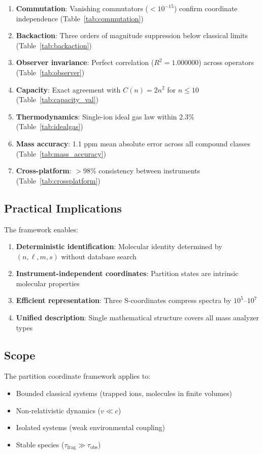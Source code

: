 \begin{enumerate}
    \item \textbf{Commutation}: Vanishing commutators ($< 10^{-15}$) confirm coordinate independence (Table~\ref{tab:commutation})
    \item \textbf{Backaction}: Three orders of magnitude suppression below classical limits (Table~\ref{tab:backaction})
    \item \textbf{Observer invariance}: Perfect correlation ($R^2 = 1.000000$) across operators (Table~\ref{tab:observer})
    \item \textbf{Capacity}: Exact agreement with $C(n) = 2n^2$ for $n \leq 10$ (Table~\ref{tab:capacity_val})
    \item \textbf{Thermodynamics}: Single-ion ideal gas law within 2.3\% (Table~\ref{tab:idealgas})
    \item \textbf{Mass accuracy}: 1.1 ppm mean absolute error across all compound classes (Table~\ref{tab:mass_accuracy})
    \item \textbf{Cross-platform}: $> 98\%$ consistency between instruments (Table~\ref{tab:crossplatform})
\end{enumerate}

\subsection{Practical Implications}

The framework enables:

\begin{enumerate}
    \item \textbf{Deterministic identification}: Molecular identity determined by $(n, \ell, m, s)$ without database search
    \item \textbf{Instrument-independent coordinates}: Partition states are intrinsic molecular properties
    \item \textbf{Efficient representation}: Three S-coordinates compress spectra by $10^5$–$10^7$
    \item \textbf{Unified description}: Single mathematical structure covers all mass analyzer types
\end{enumerate}

\subsection{Scope}

The partition coordinate framework applies to:
\begin{itemize}
    \item Bounded classical systems (trapped ions, molecules in finite volumes)
    \item Non-relativistic dynamics ($v \ll c$)
    \item Isolated systems (weak environmental coupling)
    \item Stable species ($\tau_{\mathrm{frag}} \gg \tau_{\mathrm{obs}}$)
\end{itemize}

